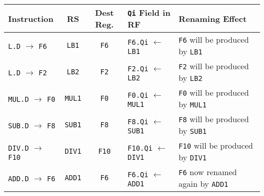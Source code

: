 \begin{examplebox}
    \begin{center}
        \begin{adjustbox}{width={\textwidth},totalheight={\textheight},keepaspectratio}
            \begin{tabular}{@{} l | c | c | l | l @{}}
                \toprule
                Instruction & RS & Dest Reg. & \texttt{Qi} Field in RF & Renaming Effect \\
                \midrule
                \texttt{L.D} $\rightarrow$ \texttt{F6}      & \texttt{LB1}  & \texttt{F6}   & \texttt{F6.Qi} $\leftarrow$ \texttt{LB1}      & \texttt{F6} will be produced by \texttt{LB1}      \\ [.3em]
                \texttt{L.D} $\rightarrow$ \texttt{F2}      & \texttt{LB2}  & \texttt{F2}   & \texttt{F2.Qi} $\leftarrow$ \texttt{LB2}      & \texttt{F2} will be produced by \texttt{LB2}      \\ [.3em]
                \texttt{MUL.D} $\rightarrow$ \texttt{F0}    & \texttt{MUL1} & \texttt{F0}   & \texttt{F0.Qi} $\leftarrow$ \texttt{MUL1}     & \texttt{F0} will be produced by \texttt{MUL1}     \\ [.3em]
                \texttt{SUB.D} $\rightarrow$ \texttt{F8}    & \texttt{SUB1} & \texttt{F8}   & \texttt{F8.Qi} $\leftarrow$ \texttt{SUB1}     & \texttt{F8} will be produced by \texttt{SUB1}     \\ [.3em]
                \texttt{DIV.D} $\rightarrow$ \texttt{F10}   & \texttt{DIV1} & \texttt{F10}  & \texttt{F10.Qi} $\leftarrow$ \texttt{DIV1}    & \texttt{F10} will be produced by \texttt{DIV1}    \\ [.3em]
                \texttt{ADD.D} $\rightarrow$ \texttt{F6}    & \texttt{ADD1} & \texttt{F6}   & \texttt{F6.Qi} $\leftarrow$ \texttt{ADD1}     & \texttt{F6} now renamed again by \texttt{ADD1}    \\
                \bottomrule
            \end{tabular}
        \end{adjustbox}
    \end{center}


\end{examplebox}
